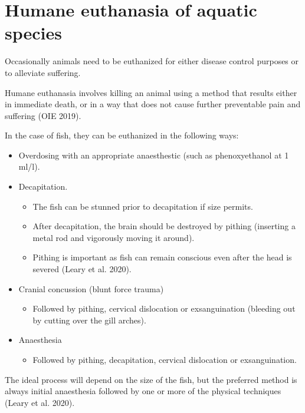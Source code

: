 \documentclass[
  letterpaper,
  DIV=11,
  numbers=noendperiod]{scrreprt}
\providecommand{\tightlist}{%
  \setlength{\itemsep}{0pt}\setlength{\parskip}{0pt}}\usepackage{longtable,booktabs,array}
\begin{document}
\hypertarget{humane-euthanasia-of-aquatic-species}{%
\section{Humane euthanasia of aquatic
species}\label{humane-euthanasia-of-aquatic-species}}

Occasionally animals need to be euthanized for either disease control
purposes or to alleviate suffering.

Humane euthanasia involves killing an animal using a method that results
either in immediate death, or in a way that does not cause further
preventable pain and suffering (OIE 2019).

In the case of fish, they can be euthanized in the following ways:

\begin{itemize}
\tightlist
\item
  Overdosing with an appropriate anaesthestic (such as phenoxyethanol at
  1 ml/l).
\item
  Decapitation.

  \begin{itemize}
  \tightlist
  \item
    The fish can be stunned prior to decapitation if size permits.
  \item
    After decapitation, the brain should be destroyed by pithing
    (inserting a metal rod and vigorously moving it around).
  \item
    Pithing is important as fish can remain conscious even after the
    head is severed (Leary et al. 2020).
  \end{itemize}
\item
  Cranial concussion (blunt force trauma)

  \begin{itemize}
  \tightlist
  \item
    Followed by pithing, cervical dislocation or exsanguination
    (bleeding out by cutting over the gill arches).
  \end{itemize}
\item
  Anaesthesia

  \begin{itemize}
  \tightlist
  \item
    Followed by pithing, decapitation, cervical dislocation or
    exsanguination.
  \end{itemize}
\end{itemize}

The ideal process will depend on the size of the fish, but the preferred
method is always initial anaesthesia followed by one or more of the
physical techniques (Leary et al. 2020).
\end{document}
